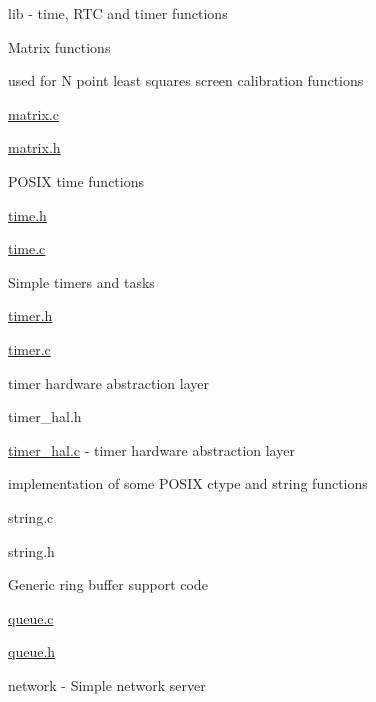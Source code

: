 \begin{DoxyItemize}
\item lib -\/ time, R\+TC and timer functions
\begin{DoxyItemize}
\item Matrix functions
\begin{DoxyItemize}
\item used for N point least squares screen calibration functions
\item \hyperlink{matrix_8c}{matrix.\+c}
\item \hyperlink{matrix_8h}{matrix.\+h}
\end{DoxyItemize}
\item P\+O\+S\+IX time functions
\begin{DoxyItemize}
\item \hyperlink{time_8h}{time.\+h}
\item \hyperlink{time_8c}{time.\+c}
\end{DoxyItemize}
\item Simple timers and tasks
\begin{DoxyItemize}
\item \hyperlink{timer_8h}{timer.\+h}
\item \hyperlink{timer_8c}{timer.\+c}
\end{DoxyItemize}
\item timer hardware abstraction layer
\begin{DoxyItemize}
\item timer\+\_\+hal.\+h
\item \hyperlink{timer__hal_8c}{timer\+\_\+hal.\+c} -\/ timer hardware abstraction layer
\end{DoxyItemize}
\item implementation of some P\+O\+S\+IX ctype and string functions
\begin{DoxyItemize}
\item string.\+c
\item string.\+h
\end{DoxyItemize}
\item Generic ring buffer support code
\begin{DoxyItemize}
\item \hyperlink{queue_8c}{queue.\+c}
\item \hyperlink{queue_8h}{queue.\+h}
\end{DoxyItemize}
\end{DoxyItemize}
\item network -\/ Simple network server
\begin{DoxyItemize}

\end{DoxyItemize}
\end{DoxyItemize}
